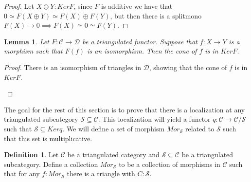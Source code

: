 \documentclass[11pt]{article}
\newtheorem{lemma}[theorem]{Lemma}
\theoremstyle{definition}
\newtheorem{definition}{Definition}[section]
\theoremstyle{remark}
\begin{document}
            \begin{proof}
                Let $X\oplus Y:KerF$, since $F$ is additive we have that $0\simeq F(X\oplus Y)\simeq F(X)\oplus F(Y)$, but then there is a splitmono $F(X)\rightarrow 0 \implies F(X)\simeq 0 \simeq F(Y)$.
            \end{proof}

            \begin{lemma}
                Let $F:\mathcal{C}\rightarrow\mathcal{D}$ be a triangulated functor. Suppose that $f:X\rightarrow Y$ is a morphism such that $F(f)$ is an isomorphism. Then the cone of $f$ is in $KerF$.
            \end{lemma}

            \begin{proof}
                There is an isomorphism of triangles in $\mathcal{D}$, showing that the cone of $f$ is in $KerF$.
                \begin{center}
                \end{center}
            \end{proof}

            The goal for the rest of this section is to prove that there is a localization at any triangulated subcategory $\mathcal{S}\subseteq\mathcal{C}$. This localization will yield a functor $q:\mathcal{C}\rightarrow \mathcal{C}/\mathcal{S}$ such that $\mathcal{S}\subseteq Kerq$. We will define a set of morphism $Mor_\mathcal{S}$ related to $\mathcal{S}$ such that this set is multiplicative.

            \begin{definition}
                Let $\mathcal{C}$ be a triangulated category and $\mathcal{S} \subseteq \mathcal{C}$ be a triangulated subcategory. Define a collection $Mor_{\mathcal{S}}$ to be a collection of morphisms in $\mathcal{C}$ such that for any $f : Mor_{\mathcal{S}}$ there is a triangle with $C : \mathcal{S}$.
                \begin{center}
                \end{center}
            \end{definition}
\end{document}
